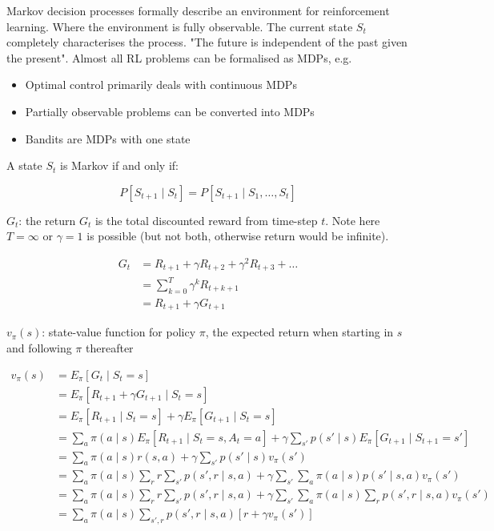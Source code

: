 \documentclass{article}
\begin{document}
Markov decision processes formally describe an environment for reinforcement learning. Where the environment is fully observable. 
The current state \(S_t\) completely characterises the process. "The future is independent of the past given the present". Almost all RL problems can be formalised as MDPs, e.g.

\begin{itemize}
    \item Optimal control primarily deals with continuous MDPs
    \item Partially observable problems can be converted into MDPs
    \item Bandits are MDPs with one state
\end{itemize}

A state \(S_t\) is Markov if and only if:

\[P[S_{t + 1} \mid S_t] = P[S_{t + 1} \mid S_1, \dots, S_t]\]

\(G_t\): the return \(G_t\) is the total discounted reward from time-step \(t\). Note here \(T = \infty\) or \(\gamma = 1\) is possible (but not both, otherwise return would be infinite).

\begin{equation*}
\begin{split}
G_t
& = R_{t + 1} + \gamma R_{t + 2} + \gamma^2 R_{t + 3} + \dots \\
& = \sum_{k = 0}^{T} \gamma^{k} R_{t + k + 1} \\
& = R_{t + 1} + \gamma G_{t + 1}
\end{split}
\end{equation*}

\(v_{\pi}(s)\): state-value function for policy \(\pi\), the expected return when starting in \(s\) and following \(\pi\) thereafter

\begin{equation*}
\begin{split}
v_{\pi}(s)
& = E_{\pi}[G_t \mid S_t = s] \\
& = E_{\pi}[R_{t + 1} + \gamma G_{t + 1} \mid S_t = s] \\
& = E_{\pi}[R_{t + 1} \mid S_t = s] + \gamma E_{\pi}[G_{t + 1} \mid S_t = s] \\
& = \sum_{a} \pi(a \mid s) E_{\pi}[R_{t + 1} \mid S_t = s, A_t = a] + \gamma \sum_{s'} p(s' \mid s) E_{\pi}[G_{t + 1} \mid S_{t + 1} = s'] \\
& = \sum_{a} \pi(a \mid s) r(s, a) + \gamma \sum_{s'} p(s' \mid s) v_{\pi}(s') \\
& = \sum_{a} \pi(a \mid s) \sum_r r \sum_{s'} p(s', r \mid s, a) + \gamma \sum_{s'} \sum_{a} \pi(a \mid s) p(s' \mid s, a) v_{\pi}(s') \\
& = \sum_{a} \pi(a \mid s) \sum_r r \sum_{s'} p(s', r \mid s, a) + \gamma \sum_{s'} \sum_{a} \pi(a \mid s) \sum_{r} p(s', r \mid s, a) v_{\pi}(s') \\
& = \sum_a \pi(a \mid s) \sum_{s', r} p(s', r \mid s, a) [r + \gamma v_{\pi}(s')]
\end{split}
\end{equation*}
\end{document}
